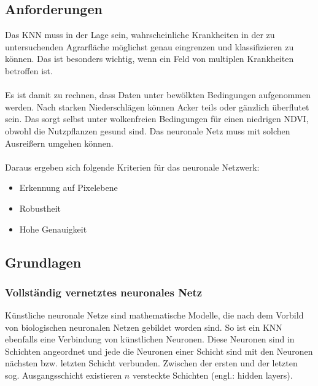 \subsection{Anforderungen}\label{sec:sub:requirements}
Das KNN muss in der Lage sein, wahrscheinliche Krankheiten in der zu untersuchenden Agrarfläche möglichst genau eingrenzen und klassifizieren zu können. Das ist besonders wichtig, wenn ein Feld von multiplen Krankheiten betroffen ist.\\\\
Es ist damit zu rechnen, dass Daten unter bewölkten Bedingungen aufgenommen werden. Nach starken Niederschlägen können Acker teils oder gänzlich überflutet sein.\cite{ref:root-rot} Das sorgt selbst unter wolkenfreien Bedingungen für einen niedrigen NDVI, obwohl die Nutzpflanzen gesund sind. Das neuronale Netz muss mit solchen \glqq Ausreißern\grqq{} umgehen können.
\\\\
Daraus ergeben sich folgende Kriterien für das neuronale Netzwerk:

\begin{itemize}
	\item Erkennung auf Pixelebene
	\item Robustheit
	\item Hohe Genauigkeit 
\end{itemize}

\subsection{Grundlagen}\label{sec:sub:basics}

\subsubsection{Vollständig vernetztes neuronales Netz}

\noindent
Künstliche neuronale Netze sind mathematische Modelle, die nach dem Vorbild von biologischen neuronalen Netzen gebildet worden sind. So ist ein KNN ebenfalls eine Verbindung von künstlichen Neuronen. Diese Neuronen sind in Schichten angeordnet und jede die Neuronen einer Schicht sind mit den Neuronen nächsten bzw. letzten Schicht verbunden. Zwischen der ersten und der letzten sog. Ausgangsschicht existieren $n$ versteckte Schichten (engl.: hidden layers). 

